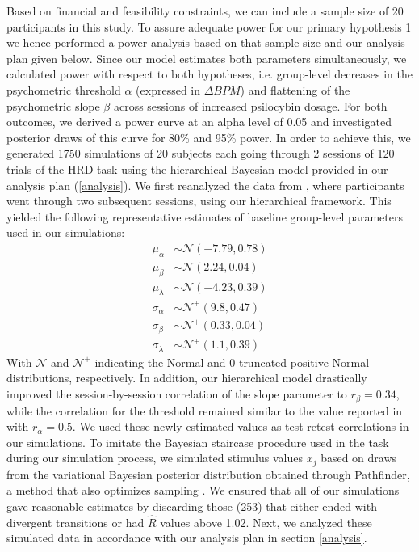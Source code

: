 \documentclass{article}
\begin{document}
Based on financial and feasibility constraints, we can include a sample size of 20 participants in this study. To assure adequate power for our primary hypothesis 1 we hence performed a power analysis based on that sample size and our analysis plan given below.
Since our model estimates both parameters simultaneously, we calculated power with respect to both hypotheses, i.e. group-level decreases in the psychometric threshold $\alpha$ (expressed in $\Delta BPM$) and flattening of the psychometric slope $\beta$ across sessions of increased psilocybin dosage. For both outcomes, we derived a power curve at an alpha level of 0.05 and investigated posterior draws of this curve for 80\% and 95\% power.
In order to achieve this, we generated 1750 simulations of 20 subjects each going through 2 sessions of 120 trials of the HRD-task using the hierarchical Bayesian model provided in our analysis plan (\ref{analysis}).
We first reanalyzed the data from \textcite{legrand2022heart}, where participants went through two subsequent sessions, using our hierarchical framework. This yielded the following representative estimates of baseline group-level parameters used in our simulations:
\begin{align*} 
\mu_{\alpha} &\sim \mathcal{N} \left(-7.79,0.78\right) \\
\mu_{\beta} &\sim \mathcal{N} \left(2.24,0.04\right) \\
\mu_{\lambda} &\sim \mathcal{N} \left(-4.23,0.39\right) \\
\sigma_{\alpha} &\sim \mathcal{N}^+ \left(9.8,0.47\right) \\
\sigma_{\beta} &\sim \mathcal{N}^+ \left(0.33,0.04\right) \\
\sigma_{\lambda} &\sim \mathcal{N}^+ \left(1.1,0.39\right)
\end{align*}
With $\mathcal{N}$ and $\mathcal{N^+}$ indicating the Normal and 0-truncated positive Normal distributions, respectively.
In addition, our hierarchical model drastically improved the session-by-session correlation of the slope parameter to $r_\beta=0.34$, while the correlation for the threshold remained similar to the value reported in \textcite{legrand2022heart} with $r_\alpha =  0.5$. We used these newly estimated values as test-retest correlations in our simulations.
To imitate the Bayesian staircase procedure used in the task during our simulation process, we simulated stimulus values $x_j$ based on draws from the variational Bayesian posterior distribution obtained through Pathfinder, a method that also optimizes sampling \parencite{zhang2022pathfinder}. 
We ensured that all of our simulations gave reasonable estimates by discarding those (253) that either ended with divergent transitions or had $\hat{R}$ values above 1.02. 
Next, we analyzed these simulated data in accordance with our analysis plan in section \ref{analysis}.
\end{document}
